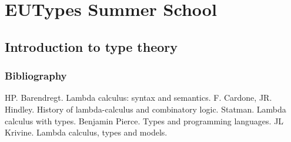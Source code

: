 \documentclass[11pt]{article}
\begin{document}
\section*{EUTypes Summer School}
\label{sec-9}
\subsection*{Introduction to type theory}
\label{sec-9-1}
\subsubsection*{Bibliography}
\label{sec-9-1-1}
HP. Barendregt. Lambda calculus: syntax and semantics.
F. Cardone, JR. Hindley. History of lambda-calculus and combinatory logic.
Statman. Lambda calculus with types.
Benjamin Pierce. Types and programming languages.
JL Krivine. Lambda calculus, types and models.
\end{document}
